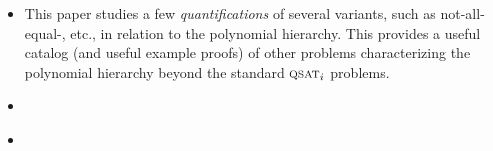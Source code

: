 \begin{itemize}
  \item {}

    \begin{annotation}
      This paper studies a few \emph{quantifications} of several \SAT{}
      variants, such as not-all-equal-, etc., in relation to the
      polynomial hierarchy.  This provides a useful catalog (and useful example
      proofs) of other problems characterizing the polynomial hierarchy beyond
      the standard \(\Problem{qsat}_i\) problems.
    \end{annotation}

  \item {}

    \begin{annotation}

    \end{annotation}

  \item {}

    \begin{annotation}

    \end{annotation}

\end{itemize}


